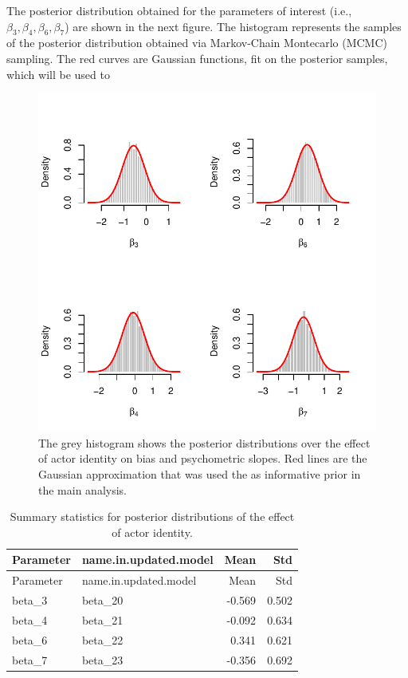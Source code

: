 \documentclass[]{article}
\begin{document}
The posterior distribution obtained for the parameters of interest
(i.e., \(\beta_3, \beta_4, \beta_6, \beta_7\)) are shown in the next
figure. The histogram represents the samples of the posterior
distribution obtained via Markov-Chain Montecarlo (MCMC) sampling. The
red curves are Gaussian functions, fit on the posterior samples, which
will be used to

\begin{figure}[H]

{\centering \includegraphics{WLR-analyses-report_files/figure-latex/unnamed-chunk-6-1} 

}

\caption{The grey histogram shows the posterior distributions over the effect of actor identity on bias and psychometric slopes. Red lines are the Gaussian approximation that was used the as informative prior in the main analysis.}\label{fig:unnamed-chunk-6}
\end{figure}

\begin{longtable}[]{@{}llrr@{}}
\caption{Summary statistics for posterior distributions of the effect of
actor identity.}\tabularnewline
\toprule
Parameter & name.in.updated.model & Mean & Std\tabularnewline
\midrule
\endfirsthead
\toprule
Parameter & name.in.updated.model & Mean & Std\tabularnewline
\midrule
\endhead
beta\_3 & beta\_20 & -0.569 & 0.502\tabularnewline
beta\_4 & beta\_21 & -0.092 & 0.634\tabularnewline
beta\_6 & beta\_22 & 0.341 & 0.621\tabularnewline
beta\_7 & beta\_23 & -0.356 & 0.692\tabularnewline
\bottomrule
\end{longtable}
\end{document}
